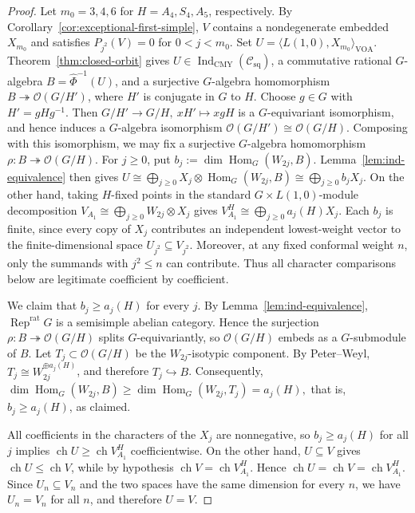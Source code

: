 \documentclass[12pt,leqno]{amsart}
\numberwithin{equation}{section} \newtheorem{thm}{Theorem}[section] \newtheorem{lem}[thm]{Lemma} \newtheorem{ex}[thm]{Example} \newtheorem{prop}[thm]{Proposition} \newtheorem{cor}[thm]{Corollary} \newtheorem{defi}[thm]{Definition} \newtheorem{rmk}[thm]{Remark} \newtheorem{notation}[thm]{Notation}
\newcommand{\Rep}{\operatorname{Rep}}
\newcommand{\Hom}{\operatorname{Hom}}
\newcommand{\ch}{\operatorname{ch}}
\newcommand{\OO}{\mathcal O}
\newcommand{\Csq}{\mathcal C_{\mathrm{sq}}}
\newcommand{\IndCMY}{\operatorname{Ind}_{\mathrm{CMY}}}
\begin{document}
\begin{proof}
Let $m_0=3,4,6$ for $H=A_4,S_4,A_5$, respectively. By Corollary~\ref{cor:exceptional-first-simple}, $V$ contains a nondegenerate embedded $X_{m_0}$ and satisfies \(P_{j^2}(V)=0\) for $0<j<m_0$. Set \(U=\langle L(1,0),X_{m_0}\rangle_{\mathrm{VOA}}.\) Theorem~\ref{thm:closed-orbit} gives \(U\in\IndCMY(\Csq)\), a commutative rational $G$-algebra \(B=\widehat\Phi^{-1}(U)\), and a surjective $G$-algebra homomorphism \(B\twoheadrightarrow\OO(G/H')\), where $H'$ is conjugate in $G$ to $H$. Choose $g\in G$ with $H'=gHg^{-1}$. Then \(G/H'\to G/H,\ xH'\mapsto xgH\) is a $G$-equivariant isomorphism, and hence induces a $G$-algebra isomorphism \(\OO(G/H')\cong\OO(G/H)\). Composing with this isomorphism, we may fix a surjective $G$-algebra homomorphism \(\rho:B\twoheadrightarrow\OO(G/H).\) For $j\ge0$, put \(b_j:=\dim\Hom_G(W_{2j},B).\) Lemma~\ref{lem:ind-equivalence} then gives \(U\cong\bigoplus_{j\ge0}X_j\otimes\Hom_G(W_{2j},B)\cong\bigoplus_{j\ge0}b_jX_j.\) On the other hand, taking $H$-fixed points in the standard $G\times L(1,0)$-module decomposition \(V_{A_1}\cong\bigoplus_{j\ge0}W_{2j}\otimes X_j\) gives \(V_{A_1}^{H}\cong\bigoplus_{j\ge0}a_j(H)X_j.\) Each $b_j$ is finite, since every copy of $X_j$ contributes an independent lowest-weight vector to the finite-dimensional space $U_{j^2}\subseteq V_{j^2}$. Moreover, at any fixed conformal weight $n$, only the summands with $j^2\le n$ can contribute. Thus all character comparisons below are legitimate coefficient by coefficient.

We claim that \(b_j\ge a_j(H)\) for every $j$. By Lemma~\ref{lem:ind-equivalence}, \(\Rep^{\mathrm{rat}}G\) is a semisimple abelian category. Hence the surjection \(\rho:B\twoheadrightarrow\OO(G/H)\) splits $G$-equivariantly, so \(\OO(G/H)\) embeds as a $G$-submodule of $B$. Let $T_j\subset\OO(G/H)$ be the $W_{2j}$-isotypic component. By Peter--Weyl, \(T_j\cong W_{2j}^{\oplus a_j(H)}\), and therefore \(T_j\hookrightarrow B\). Consequently, \(\dim\Hom_G(W_{2j},B)\ge\dim\Hom_G(W_{2j},T_j)=a_j(H),\) that is, \(b_j\ge a_j(H)\), as claimed.

All coefficients in the characters of the $X_j$ are nonnegative, so \(b_j\ge a_j(H)\) for all $j$ implies \(\ch U\ge\ch V_{A_1}^{H}\) coefficientwise. On the other hand, $U\subseteq V$ gives \(\ch U\le\ch V\), while by hypothesis \(\ch V=\ch V_{A_1}^{H}\). Hence \(\ch U=\ch V=\ch V_{A_1}^{H}.\) Since $U_n\subseteq V_n$ and the two spaces have the same dimension for every $n$, we have $U_n=V_n$ for all $n$, and therefore $U=V$.


\end{proof}
\end{document}
